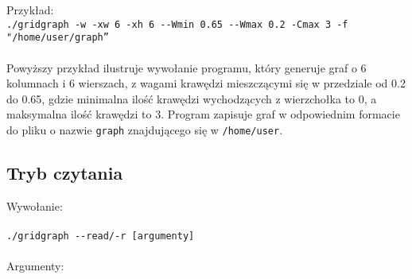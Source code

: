 \documentclass[11pt,a4paper]{report}
\begin{document}
    Przykład:\\
    \verb|./gridgraph -w -xw 6 -xh 6 --Wmin 0.65 --Wmax 0.2 -Cmax 3 -f "/home/user/graph”|
    \\
    \\
    Powyższy przykład ilustruje wywołanie programu, który generuje graf o 6 kolumnach i 6 wierszach, z wagami krawędzi mieszczącymi się w przedziale od 0.2 do 0.65, gdzie minimalna ilość krawędzi wychodzących z wierzchołka to 0, a maksymalna ilość krawędzi to 3. Program zapisuje graf w odpowiednim formacie do pliku o nazwie \verb|graph| znajdującego się w \verb|/home/user|.
    \subsection{Tryb czytania}
    Wywołanie:\\
    \\
    \verb|./gridgraph --read/-r [argumenty]|\\
    \\
    Argumenty:
\end{document}
